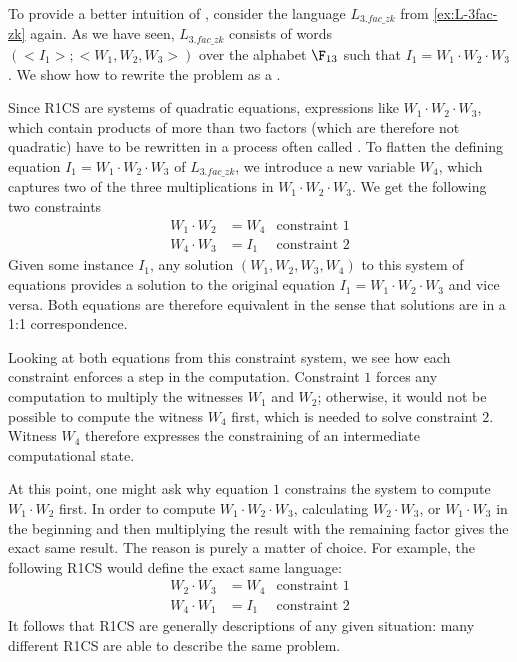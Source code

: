 \begin{example}\label{ex:3-factorization-r1cs} To provide a better intuition of , consider the language $L_{3.fac\_zk}$ from \examplename{} \ref{ex:L-3fac-zk} again. As we have seen, $L_{3.fac\_zk}$ consists of words $(<I_1>;<W_1,W_2,W_3>)$ over the alphabet $\F_{13}$ such that $I_1 = W_1\cdot W_2\cdot W_3$. We show how to rewrite the problem as a .

Since R1CS are systems of quadratic equations, expressions like $W_1\cdot W_2\cdot W_3$, which contain products of more than two factors (which are therefore not quadratic) have to be rewritten in a process often called . To flatten the defining equation $I_1 = W_1\cdot W_2\cdot W_3$ of $L_{3.fac\_zk}$, we introduce a new variable $W_4$, which captures two of the three multiplications in $W_1\cdot W_2\cdot W_3$. We get the following two constraints
\begin{align*}
W_1 \cdot W_2 & = W_4 & \text{constraint } 1 \\
W_4 \cdot W_3 & = I_1 & \text{constraint } 2
\end{align*}
Given some instance $I_1$, any solution $(W_1,W_2,W_3,W_4)$ to this system of equations provides a solution to the original equation $I_1 = W_1\cdot W_2\cdot W_3$ and vice versa. Both equations are therefore equivalent in the sense that solutions are in a 1:1 correspondence.

Looking at both equations from this constraint system, we see how each constraint enforces a step in the computation. Constraint $1$ forces any computation to multiply the witnesses $W_1$ and $W_2$; otherwise, it would not be possible to compute the witness $W_4$ first, which is needed to solve constraint $2$. Witness $W_4$ therefore expresses the constraining of an intermediate computational state.

At this point, one might ask why equation $1$ constrains the system to compute $W_1\cdot W_2$ first. In order to compute $W_1\cdot W_2 \cdot W_3$, calculating $W_2\cdot W_3$, or $W_1\cdot W_3$ in the beginning and then multiplying the result with the remaining factor gives the exact same result.  The reason is purely a matter of choice. For example, the following R1CS would define the exact same language:
\begin{align*}
W_2 \cdot W_3 & = W_4 & \text{constraint } 1 \\
W_4 \cdot W_1 & = I_1 & \text{constraint } 2 
\end{align*}
It follows that R1CS are generally  descriptions of any given situation: many different R1CS are able to describe the same problem.


\end{example}
